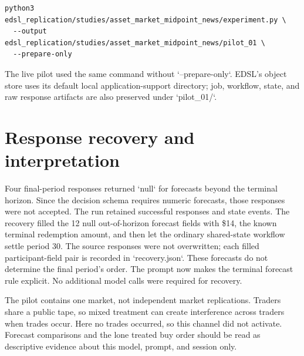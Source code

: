 \documentclass[11pt]{article}
\begin{document}
\begin{lstlisting}
python3 edsl_replication/studies/asset_market_midpoint_news/experiment.py \
  --output edsl_replication/studies/asset_market_midpoint_news/pilot_01 \
  --prepare-only
\end{lstlisting}

The live pilot used the same command without `--prepare-only`. EDSL's object
store uses its default local application-support directory; job, workflow,
state, and raw response artifacts are also preserved under `pilot\_01/`.

\section{Response recovery and interpretation}
Four final-period responses returned `null` for forecasts beyond the terminal
horizon. Since the decision schema requires numeric forecasts, those responses
were not accepted. The run retained successful responses and state events.
The recovery filled the 12 null out-of-horizon forecast fields with \$14, the
known terminal redemption amount, and then let the ordinary shared-state
workflow settle period 30. The source responses were not overwritten; each
filled participant-field pair is recorded in `recovery.json`. These forecasts
do not determine the final period's order. The prompt now makes the terminal
forecast rule explicit. No additional model calls were required for recovery.

The pilot contains one market, not independent market replications. Traders
share a public tape, so mixed treatment can create interference across traders
when trades occur. Here no trades occurred, so this channel did not activate.
Forecast comparisons and the lone treated buy order should be read as
descriptive evidence about this model, prompt, and session only.
\end{document}
